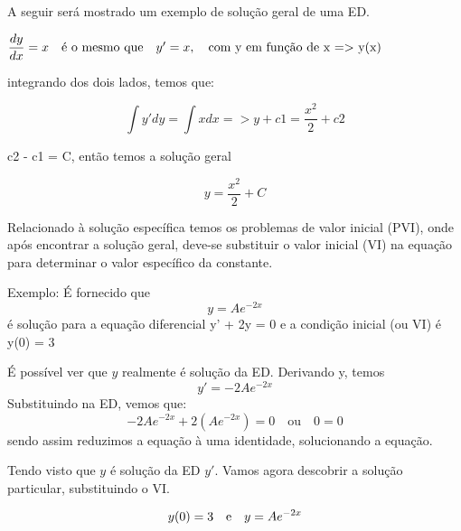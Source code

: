 A seguir será mostrado um exemplo de solução geral de uma ED.  \linebreak

			$ \dfrac{dy}{dx} = x \quad  \textrm{é o mesmo que} \quad y' = x, \quad \textrm{com y em função de x => y(x)} \\
			$
			

			integrando dos dois lados, temos que: \linebreak
			
			\begin{equation}
				\int y' dy = \int x dx => y + c1 = \dfrac{x^2}{2} + c2 
			\end{equation}
			
			\begin{center}
				c2 - c1 = C, então temos a solução geral  \\
			\end{center}
			
			\begin{equation}
				y = \frac{x^2}{2} + C
			\end{equation}
		
	
	

Relacionado à solução específica temos os problemas de valor inicial (PVI), onde após encontrar a solução geral, deve-se substituir o valor inicial (VI) na equação para determinar o valor específico da constante.

Exemplo: É fornecido que 
	\begin{equation}y = Ae^{-2x}
	\end{equation}
	é solução para a equação diferencial y' + 2y = 0 e a condição inicial (ou VI) é y(0) = 3 

É possível ver que $y$ realmente é solução da ED.
		Derivando y, temos \begin{equation} y'= -2Ae^{-2x} \end{equation} Substituindo na ED, vemos que: 
		\begin{equation} -2Ae^{-2x} + 2(Ae^{-2x}) = 0  \quad \textrm{ou} \quad 0 = 0\end{equation} sendo assim reduzimos a equação à uma identidade, solucionando a equação.

		Tendo visto que $y$ é solução da ED $y'$. Vamos agora descobrir a solução particular, substituindo o VI. 

		\begin{equation}
		y(0) = 3 \quad \textrm{e} \quad  y = Ae^{-2x} \newline 
		\end{equation}

